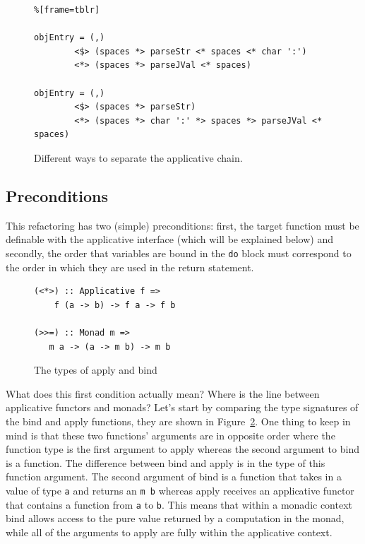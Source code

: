 \begin{figure}[t]
\begin{lstlisting}%[frame=tblr]

objEntry = (,) 
        <$> (spaces *> parseStr <* spaces <* char ':') 
        <*> (spaces *> parseJVal <* spaces)

objEntry = (,) 
        <$> (spaces *> parseStr) 
        <*> (spaces *> char ':' *> spaces *> parseJVal <* spaces)
\end{lstlisting}
\caption{Different ways to separate the applicative chain.}
\label{objEntry2}
\end{figure}

\subsection{Preconditions}
\label{sec:appPrecons}

This refactoring has two (simple) preconditions: first, the target function must be definable with the applicative interface (which will be explained below) and secondly, the order that variables are bound in the \texttt{do} block must correspond to the order in which they are used in the return statement.

\begin{figure}[t]
\begin{lstlisting}
(<*>) :: Applicative f => 
	f (a -> b) -> f a -> f b

(>>=) :: Monad m => 
   m a -> (a -> m b) -> m b
\end{lstlisting}
\caption{The types of apply and bind}
\label{appBind}
\end{figure} 

What does this first condition actually mean? Where is the line between applicative functors and monads? Let's start by comparing the type signatures of the bind and apply functions, they are shown in Figure~\ref{appBind}. One thing to keep in mind is that these two functions' arguments are in opposite order where the function type is the first argument to apply whereas the second argument to bind is a function. The difference between bind and apply is in the type of this function argument. The second argument of bind is a function that takes in a value of type \texttt{a} and returns an \texttt{m b} whereas apply receives an applicative functor that contains a function from \texttt{a} to \texttt{b}. This means that within a monadic context bind allows access to the pure value returned by a computation in the monad, while all of the arguments to apply are fully within the applicative context.

